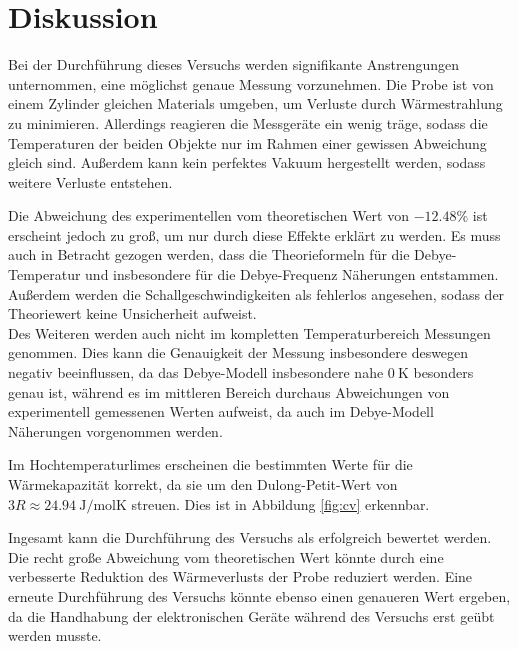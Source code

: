 \section{Diskussion}
\label{sec:Diskussion}

Bei der Durchführung dieses Versuchs werden signifikante Anstrengungen unternommen, eine möglichst genaue Messung vorzunehmen.
Die Probe ist von einem Zylinder gleichen Materials umgeben, um Verluste durch Wärmestrahlung zu minimieren.
Allerdings reagieren die Messgeräte ein wenig träge, sodass die Temperaturen der beiden Objekte nur im Rahmen einer gewissen Abweichung gleich sind. Außerdem kann kein perfektes Vakuum hergestellt werden, sodass weitere Verluste entstehen.

Die Abweichung des experimentellen vom theoretischen Wert von $-12.48\%$ ist erscheint jedoch zu groß, um nur durch diese Effekte erklärt zu werden. Es muss auch in Betracht gezogen werden, dass die Theorieformeln für die Debye-Temperatur und insbesondere für die Debye-Frequenz Näherungen entstammen. Außerdem werden die Schallgeschwindigkeiten als fehlerlos angesehen, sodass der Theoriewert keine Unsicherheit aufweist.\\
Des Weiteren werden auch nicht im kompletten Temperaturbereich Messungen genommen. Dies kann die Genauigkeit der Messung insbesondere deswegen negativ beeinflussen, da das Debye-Modell insbesondere nahe $\SI{0}{\kelvin}$ besonders genau ist, während es im mittleren Bereich durchaus Abweichungen von experimentell gemessenen Werten aufweist, da auch im Debye-Modell Näherungen vorgenommen werden.

Im Hochtemperaturlimes erscheinen die bestimmten Werte für die Wärmekapazität korrekt,
da sie um den Dulong-Petit-Wert von $3R \approx \SI{24.94}{\joule\per\mole\kelvin}$ streuen.
Dies ist in Abbildung \ref{fig:cv} erkennbar.

Ingesamt kann die Durchführung des Versuchs als erfolgreich bewertet werden.
Die recht große Abweichung vom theoretischen Wert könnte durch eine verbesserte Reduktion des Wärmeverlusts der Probe reduziert werden.
Eine erneute Durchführung des Versuchs könnte ebenso einen genaueren Wert ergeben, da die Handhabung der elektronischen Geräte während des Versuchs erst geübt werden musste. 

%
%
%
